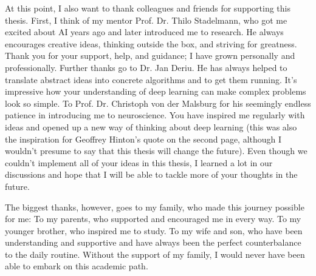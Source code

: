 At this point, I also want to thank colleagues and friends for supporting this thesis.
First, I think of my mentor Prof. Dr. Thilo Stadelmann, who got me excited about AI years ago and later introduced me to research.
He always encourages creative ideas, thinking outside the box, and striving for greatness.
Thank you for your support, help, and guidance; I have grown personally and professionally.
Further thanks go to Dr. Jan Deriu. 
He has always helped to translate abstract ideas into concrete algorithms and to get them running.
It's impressive how your understanding of deep learning can make complex problems look so simple.
To Prof. Dr. Christoph von der Malsburg for his seemingly endless patience in introducing me to neuroscience.
You have inspired me regularly with ideas and opened up a new way of thinking about deep learning (this was also the inspiration for Geoffrey Hinton's quote on the second page, although I wouldn't presume to say that this thesis will change the future).
Even though we couldn't implement all of your ideas in this thesis, I learned a lot in our discussions and hope that I will be able to tackle more of your thoughts in the future.

The biggest thanks, however, goes to my family, who made this journey possible for me:
To my parents, who supported and encouraged me in every way.
To my younger brother, who inspired me to study.
To my wife and son, who have been understanding and supportive and have always been the perfect counterbalance to the daily routine.
Without the support of my family, I would never have been able to embark on this academic path.
\normalsize

